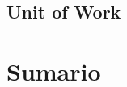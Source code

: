 \documentclass[handout,a4paper,slidestop,xcolor=pst,blue]{beamer}
\begin{document}
\subsection{Unit of Work}


\section{Sumario}
\end{document}
